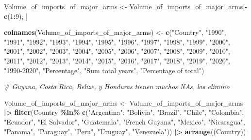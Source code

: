 \documentclass[
  11pt,
]{article}
\newenvironment{Shaded}{\begin{snugshade}}{\end{snugshade}}
\newcommand{\CommentTok}[1]{\textcolor[rgb]{0.56,0.35,0.01}{\textit{#1}}}
\newcommand{\DecValTok}[1]{\textcolor[rgb]{0.00,0.00,0.81}{#1}}
\newcommand{\FunctionTok}[1]{\textcolor[rgb]{0.13,0.29,0.53}{\textbf{#1}}}
\newcommand{\NormalTok}[1]{#1}
\newcommand{\OtherTok}[1]{\textcolor[rgb]{0.56,0.35,0.01}{#1}}
\newcommand{\SpecialCharTok}[1]{\textcolor[rgb]{0.81,0.36,0.00}{\textbf{#1}}}
\newcommand{\StringTok}[1]{\textcolor[rgb]{0.31,0.60,0.02}{#1}}
\begin{document}
\begin{Shaded}
\begin{Highlighting}[]
\NormalTok{Volume\_of\_imports\_of\_major\_arms }\OtherTok{\textless{}{-}}\NormalTok{ Volume\_of\_imports\_of\_major\_arms[}\SpecialCharTok{{-}}\FunctionTok{c}\NormalTok{(}\DecValTok{1}\SpecialCharTok{:}\DecValTok{9}\NormalTok{), ]}

\FunctionTok{colnames}\NormalTok{(Volume\_of\_imports\_of\_major\_arms) }\OtherTok{\textless{}{-}} \FunctionTok{c}\NormalTok{(}\StringTok{"Country"}\NormalTok{, }\StringTok{"1990"}\NormalTok{, }\StringTok{"1991"}\NormalTok{, }\StringTok{"1992"}\NormalTok{,}
\StringTok{"1993"}\NormalTok{, }\StringTok{"1994"}\NormalTok{, }\StringTok{"1995"}\NormalTok{, }\StringTok{"1996"}\NormalTok{, }\StringTok{"1997"}\NormalTok{, }\StringTok{"1998"}\NormalTok{, }\StringTok{"1999"}\NormalTok{, }\StringTok{"2000"}\NormalTok{, }\StringTok{"2001"}\NormalTok{, }\StringTok{"2002"}\NormalTok{,}
\StringTok{"2003"}\NormalTok{, }\StringTok{"2004"}\NormalTok{, }\StringTok{"2005"}\NormalTok{, }\StringTok{"2006"}\NormalTok{, }\StringTok{"2007"}\NormalTok{, }\StringTok{"2008"}\NormalTok{, }\StringTok{"2009"}\NormalTok{, }\StringTok{"2010"}\NormalTok{, }\StringTok{"2011"}\NormalTok{, }\StringTok{"2012"}\NormalTok{,}
\StringTok{"2013"}\NormalTok{, }\StringTok{"2014"}\NormalTok{, }\StringTok{"2015"}\NormalTok{, }\StringTok{"2016"}\NormalTok{, }\StringTok{"2017"}\NormalTok{, }\StringTok{"2018"}\NormalTok{, }\StringTok{"2019"}\NormalTok{, }\StringTok{"2020"}\NormalTok{, }\StringTok{"1990{-}2020"}\NormalTok{,}
\StringTok{"Percentage"}\NormalTok{, }\StringTok{"Sum total years"}\NormalTok{, }\StringTok{"Percentage of total"}\NormalTok{)}

\CommentTok{\# Guyana, Costa Rica, Belize, y Honduras tienen muchos NAs, las elimino}

\NormalTok{Volume\_of\_imports\_of\_major\_arms }\OtherTok{\textless{}{-}}\NormalTok{ Volume\_of\_imports\_of\_major\_arms }\SpecialCharTok{|\textgreater{}}
\FunctionTok{filter}\NormalTok{(Country }\SpecialCharTok{\%in\%} \FunctionTok{c}\NormalTok{(}\StringTok{"Argentina"}\NormalTok{, }\StringTok{"Bolivia"}\NormalTok{, }\StringTok{"Brazil"}\NormalTok{, }\StringTok{"Chile"}\NormalTok{, }\StringTok{"Colombia"}\NormalTok{,}
\StringTok{"Ecuador"}\NormalTok{, }\StringTok{"El Salvador"}\NormalTok{, }\StringTok{"Guatemala"}\NormalTok{, }\StringTok{"French Guyana"}\NormalTok{, }\StringTok{"Mexico"}\NormalTok{, }\StringTok{"Nicaragua"}\NormalTok{,}
\StringTok{"Panama"}\NormalTok{, }\StringTok{"Paraguay"}\NormalTok{, }\StringTok{"Peru"}\NormalTok{, }\StringTok{"Uruguay"}\NormalTok{, }\StringTok{"Venezuela"}\NormalTok{)) }\SpecialCharTok{|\textgreater{}}
  \FunctionTok{arrange}\NormalTok{((Country))}


\end{Highlighting}
\end{Shaded}
\end{document}
